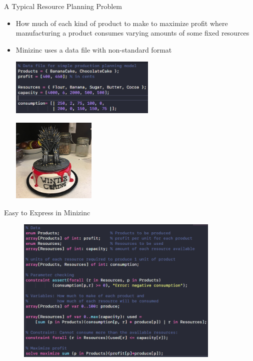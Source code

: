 \documentclass[xcolor=dvipsnames,aspectratio=169]{beamer}
\begin{document}
\begin{frame}{A Typical Resource Planning Problem}
        \begin{itemize}
            \item  How much of each kind of product to make to maximize profit where manufacturing a product consumes varying amounts of some fixed resources
            \item Minizinc uses a data file with non-standard format
            \begin{multicols}{2}
            \includegraphics[width = 70mm ]{mz_production_data.png}
            \columnbreak
            
            \includegraphics[width = 40mm]{cake.jpg}
            \end{multicols}
        \end{itemize}

\end{frame}

\begin{frame}{Easy to Express in Minizinc}
    \begin{figure}[t]
     \includegraphics[height = 70mm, pos = center]{mz_production_model.png}
    \centering
    \end{figure}
\end{frame}
\end{document}
